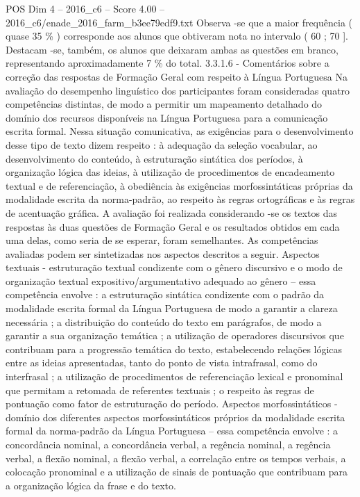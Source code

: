 \begin{textsample}{POS Dim 4 – 2016\_c6 – Score 4.00 – 2016\_c6/enade\_2016\_farm\_b3ee79edf9.txt}
Observa -se que a maior frequência ( quase 35 \% ) corresponde aos alunos que obtiveram nota no intervalo ( 60 ; 70 ].
Destacam -se, também, os alunos que deixaram ambas as questões em branco, representando aproximadamente 7 \% do total. 3.3.1.6 - Comentários sobre a correção das respostas de Formação Geral com respeito à Língua Portuguesa Na avaliação do desempenho linguístico dos participantes foram consideradas quatro competências distintas, de modo a permitir um mapeamento detalhado do domínio dos recursos disponíveis na Língua Portuguesa para a comunicação escrita formal.
Nessa situação comunicativa, as exigências para o desenvolvimento desse tipo de texto dizem respeito : à adequação da seleção vocabular, ao desenvolvimento do conteúdo, à estruturação sintática dos períodos, à organização lógica das ideias, à utilização de procedimentos de encadeamento textual e de referenciação, à obediência às exigências morfossintáticas próprias da modalidade escrita da norma-padrão, ao respeito às regras ortográficas e às regras de acentuação gráfica.
A avaliação foi realizada considerando -se os textos das respostas às duas questões de Formação Geral e os resultados obtidos em cada uma delas, como seria de se esperar, foram semelhantes.
As competências avaliadas podem ser sintetizadas nos aspectos descritos a seguir.
Aspectos textuais - estruturação textual condizente com o gênero discursivo e o modo de organização textual expositivo/argumentativo adequado ao gênero – essa competência envolve : a estruturação sintática condizente com o padrão da modalidade escrita formal da Língua Portuguesa de modo a garantir a clareza necessária ; a distribuição do conteúdo do texto em parágrafos, de modo a garantir a sua organização temática ; a utilização de operadores discursivos que contribuam para a progressão temática do texto, estabelecendo relações lógicas entre as ideias apresentadas, tanto do ponto de vista intrafrasal, como do interfrasal ; a utilização de procedimentos de referenciação lexical e pronominal que permitam a retomada de referentes textuais ; o respeito às regras de pontuação como fator de estruturação do período.
Aspectos morfossintáticos - domínio dos diferentes aspectos morfossintáticos próprios da modalidade escrita formal da norma-padrão da Língua Portuguesa – essa competência envolve : a concordância nominal, a concordância verbal, a regência nominal, a regência verbal, a flexão nominal, a flexão verbal, a correlação entre os tempos verbais, a colocação pronominal e a utilização de sinais de pontuação que contribuam para a organização lógica da frase e do texto.

\end{textsample}
